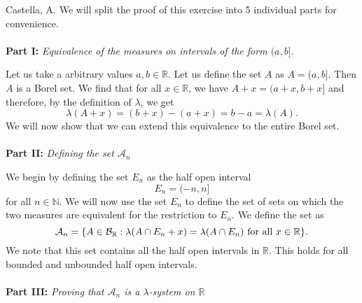 \begin{solution}[3.19]{Castella, A.}
    We will split the proof of this exercise into 5 individual parts for convenience.\\
    \\
    \textbf{Part I:} \textit{Equivalence of the measures on intervals of the form $(a,b]$}.
    
    Let us take a arbitrary values $a,b \in \mathbb{R}$. Let us define the set $A$ as $A = (a,b]$. Then $A$ is a Borel set. We find that for all $x\in\mathbb{R}$, we have $A + x = (a+x,b+x]$ and therefore, by the definition of $\lambda$, we get 
    $$
        \lambda(A+x) = (b+x)-(a+x) = b - a = \lambda(A).
    $$
    We will now show that we can extend this equivalence to the entire Borel set.\\
    \\
    \textbf{Part II:} \textit{Defining the set $\mathcal{A}_n$}
    
    We begin by defining the set $E_n$ as the half open interval
    $$
        E_n = (-n,n]
    $$
    for all $n \in \mathbb{N}$. We will now use the set $E_n$ to define the set of sets on which the two measures are equivalent for the restriction to $E_n$. We define the set as
    $$
        \mathcal{A}_n = \{A\in\mathcal B_{\mathbb R} : \lambda(A\cap E_n + x) = \lambda(A\cap E_n) \text{ for all }x\in\mathbb{R}\}.
    $$
    We note that this set contains all the half open intervals in $\mathbb{R}$. This holds for all bounded and unbounded half open intervals.\\
    \\
    \textbf{Part III:} \textit{Proving that $\mathcal{A}_n$ is a $\lambda$-system on $\mathbb{R}$}
    

\end{solution}
